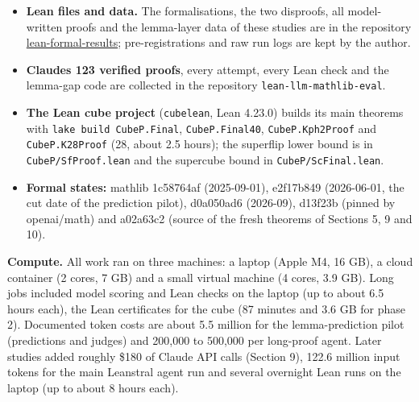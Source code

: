 \documentclass[11pt,a4paper]{article}
\providecommand{\tightlist}{\setlength{\itemsep}{0pt}\setlength{\parskip}{0pt}}
\begin{document}
\begin{itemize}
\tightlist
\item
  \textbf{Lean files and data.} The formalisations, the two disproofs, all model-written proofs and the lemma-layer data of these studies are in the repository \href{https://github.com/MatheMagicLabs/lean-formal-results}{lean-formal-results}; pre-registrations and raw run logs are kept by the author.
\item
  \textbf{Claude\textquotesingle s 123 verified proofs}, every attempt, every Lean check and the lemma-gap code are collected in the repository \texttt{lean-llm-mathlib-eval}.
\item
  \textbf{The Lean cube project} (\texttt{cubelean}, Lean 4.23.0) builds its main theorems with \texttt{lake\ build\ CubeP.Final}, \texttt{CubeP.Final40}, \texttt{CubeP.Kph2Proof} and \texttt{CubeP.K28Proof} (28, about 2.5 hours); the superflip lower bound is in \texttt{CubeP/\allowbreak{}SfProof.lean} and the supercube bound in \texttt{CubeP/\allowbreak{}ScFinal.lean}.
\item
  \textbf{Formal states:} mathlib 1c58764af (2025-09-01), e2f17b849 (2026-06-01, the cut date of the prediction pilot), d0a050ad6 (2026-09), d13f23b (pinned by openai/math) and a02a63c2 (source of the fresh theorems of Sections 5, 9 and 10).
\end{itemize}

\textbf{Compute.} All work ran on three machines: a laptop (Apple M4, 16 GB), a cloud container (2 cores, 7 GB) and a small virtual machine (4 cores, 3.9 GB). Long jobs included model scoring and Lean checks on the laptop (up to about 6.5 hours each), the Lean certificates for the cube (87 minutes and 3.6 GB for phase 2). Documented token costs are about 5.5 million for the lemma-prediction pilot (predictions and judges) and 200,000 to 500,000 per long-proof agent. Later studies added roughly \$180 of Claude API calls (Section 9), 122.6 million input tokens for the main Leanstral agent run and several overnight Lean runs on the laptop (up to about 8 hours each).
\end{document}

